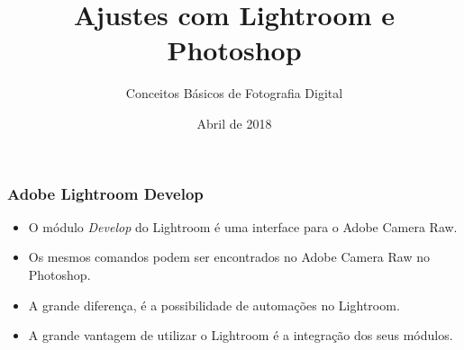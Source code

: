 


\usepackage{pifont}
\def\cmark{\ding{51}}
\def\xmark{\ding{55}}

\title{Ajustes com Lightroom e Photoshop}
\subtitle{Conceitos Básicos de Fotografia Digital}
\author{}
\date{Abril de 2018}



\coverframe

\begin{frame}
  \frametitle{Adobe Lightroom Develop}
  \begin{itemize}
      \item O módulo \textit{Develop} do Lightroom é uma interface para o Adobe Camera Raw.
      \item Os mesmos comandos podem ser encontrados no Adobe Camera Raw no Photoshop.
      \item A grande diferença, é a possibilidade de automações no Lightroom.
      \item A grande vantagem de utilizar o Lightroom é a integração dos seus módulos.
  \end{itemize}
\end{frame}


